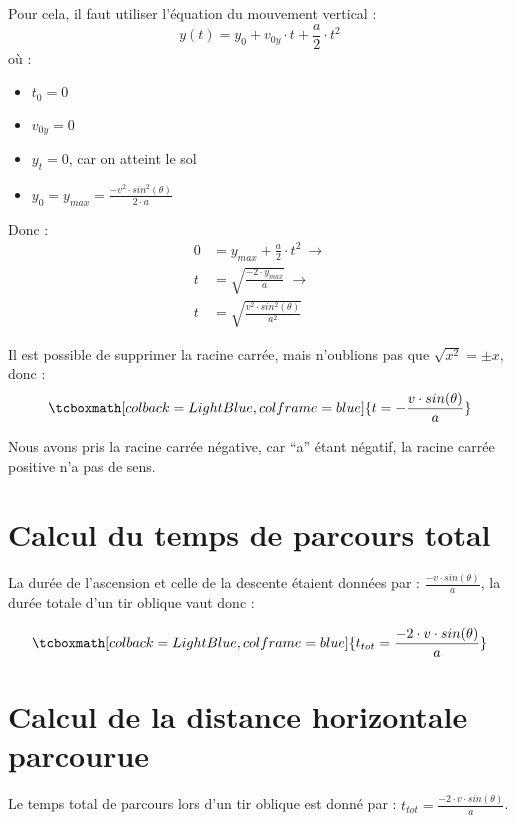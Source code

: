 Pour cela, il faut utiliser l'équation du mouvement vertical :
\begin{equation}
    y(t)=y_0 + v_{0y} \cdot t + \frac{a}{2} \cdot t^2
\end{equation} où :

\begin{itemize}[label=\textbullet]
    \item \(t_0=0\)
    \item \(v_{0y}=0\)
    \item \(y_t=0\), car on atteint le sol
    \item \(y_0=y_{max}=\frac{-v^2 \cdot sin^2(\theta)}{2 \cdot a}\)
\end{itemize}

Donc :
\begin{align}
    0 & =y_{max}+\frac{a}{2} \cdot t^2 \ \rightarrow     \\
    t & =\sqrt{\frac{-2 \cdot y_{max}}{a}} \ \rightarrow \\
    t & =\sqrt{\frac{v^2 \cdot sin^2 (\theta)}{a^2}}
\end{align}

Il est possible de supprimer la racine carrée, mais n'oublions pas que \(\sqrt{x^2}=\pm x\), donc :
\begin{equation}
    \tcboxmath[colback=LightBlue,colframe=blue]{t=-\frac{v \cdot sin(\theta)}{a}}
\end{equation}

Nous avons pris la racine carrée négative, car \enquote{a} étant négatif, la racine carrée positive n'a pas de sens.

\section{Calcul du temps de parcours total}
La durée de l'ascension et celle de la descente étaient données par : \(\frac{-v \cdot sin(\theta)}{a}\), la durée totale d'un tir oblique vaut donc :

\begin{equation}
    \tcboxmath[colback=LightBlue,colframe=blue]{t_{tot}=\frac{-2 \cdot v \cdot sin(\theta)}{a}}
\end{equation}

\section{Calcul de la distance horizontale parcourue}
Le temps total de parcours lors d'un tir oblique est donné par : \(t_{tot}=\frac{-2 \cdot v \cdot sin(\theta)}{a}\).

